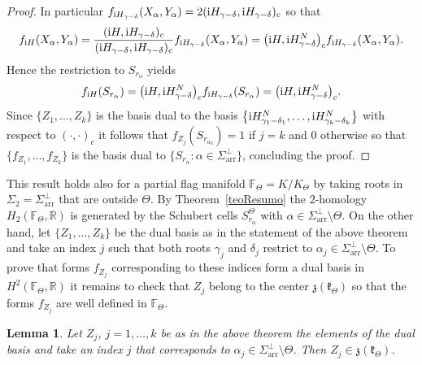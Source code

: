 \documentclass[pdftex]{sigma}
\numberwithin{equation}{section}
\newtheorem{Lemma}[Theorem]{Lemma}
\begin{document}
\begin{proof}
In particular $f_{{\rm i}H_{\gamma -\delta }} ( X_{\alpha },Y_{\alpha } ) =2 ( {\rm i}H_{\gamma -\delta },{\rm i}H_{\gamma -\delta } ) _{c}$ so that
\begin{gather*}
f_{{\rm i}H}( X_{\alpha },Y_{\alpha }) =\frac{( {\rm i}H,{\rm i}H_{\gamma-\delta }) _{c}}{( {\rm i}H_{\gamma -\delta },{\rm i}H_{\gamma -\delta}) _{c}}f_{{\rm i}H_{\gamma -\delta }}( X_{\alpha },Y_{\alpha })
=\big( {\rm i}H,{\rm i}H_{\gamma -\delta }^{N}\big) _{c}f_{{\rm i}H_{\gamma -\delta}}( X_{\alpha },Y_{\alpha }).
\end{gather*}
Hence the restriction to $S_{r_{\alpha }}$ yields%
\begin{gather*}
f_{{\rm i}H} ( S_{r_{\alpha }} ) =\big( {\rm i}H,{\rm i}H_{\gamma -\delta }^{N}\big) _{c}f_{{\rm i}H_{\gamma -\delta }} ( S_{r_{\alpha }} ) =\big( {\rm i}H,{\rm i}H_{\gamma -\delta }^{N}\big) _{c}.
\end{gather*}
Since $\{Z_{1},\ldots,Z_{k}\}$ is the basis dual to the basis $\big\{{\rm i}H_{\gamma_{1}-\delta _{1}}^{N},\ldots,{\rm i}H_{\gamma _{k}-\delta _{k}}^{N}\big\}$ with respect to $(\cdot,\cdot) _{c}$ it follows that $f_{Z_{j}} ( S_{r_{\alpha _{k}}} ) =1$ if $j=k$ and $0$ otherwise so that $\{f_{Z_{1}},\ldots, f_{Z_{k}}\}$ is the basis dual to $\{S_{r_{\alpha}}\colon \alpha \in \Sigma _{\mathrm{arr}}^{\bot }\}$, concluding the proof.
\end{proof}

This result holds also for a partial flag manifold $\mathbb{F}_{\Theta}=K/K_{\Theta }$ by taking roots in $\Sigma _{2}=\Sigma _{\mathrm{arr}}^{\bot }$ that are outside $\Theta $. By Theorem~\ref{teoResumo} the $2$-homology $H_{2}( \mathbb{F}_{\Theta },\mathbb{R}) $ is generated by the Schubert cells $S_{r_{\alpha }}^{\Theta }$ with $\alpha \in \Sigma _{\mathrm{arr}}^{\bot }\setminus \Theta $. On the other hand, let $\{Z_{1},\ldots,Z_{k}\}$ be the dual basis as in the statement of the above theorem and take an index $j$ such that both roots $\gamma _{j}$ and $\delta _{j}$ restrict to $\alpha _{j}\in \Sigma _{\mathrm{arr}}^{\bot }\setminus \Theta $. To prove that forms $f_{Z_{j}}$ corresponding to these indices form a dual basis in~$H^{2} ( \mathbb{F}_{\Theta },\mathbb{R} ) $ it remains to check that $Z_{j}$ belong to the center $\mathfrak{z}(\mathfrak{k}_{\Theta }) $ so that the forms $f_{Z_{j}}$ are well defined in $\mathbb{F}_{\Theta }$.

\begin{Lemma} Let $Z_{j}$, $j=1,\ldots,k$ be as in the above theorem the elements of the dual basis and take an index $j$ that corresponds to $\alpha _{j}\in \Sigma _{\mathrm{arr}}^{\bot }\setminus \Theta $. Then $Z_{j}\in \mathfrak{z}(\mathfrak{k}_{\Theta }) $.
\end{Lemma}
\end{document}
